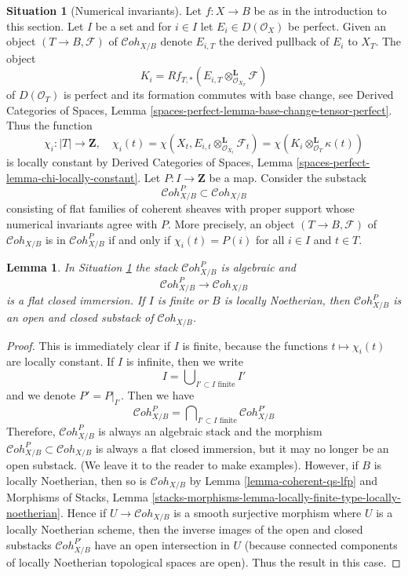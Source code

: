 \documentclass{stacks-project}
\theoremstyle{plain}
\newtheorem{lemma}[subsection]{Lemma}
\theoremstyle{definition}
\newtheorem{situation}[subsection]{Situation}
\theoremstyle{remark}
\numberwithin{equation}{subsection}
\def\Cohstack{\mathcal{C}\!\mathit{oh}}
\begin{document}
\begin{situation}[Numerical invariants]
\label{situation-numerical}
Let $f : X \to B$ be as in the introduction to this section. Let $I$
be a set and for $i \in I$ let $E_i \in D(\mathcal{O}_X)$ be perfect.
Given an object $(T \to B, \mathcal{F})$ of $\Cohstack_{X/B}$
denote $E_{i, T}$ the derived pullback of $E_i$ to $X_T$.
The object
$$
K_i = Rf_{T, *}(E_{i, T} \otimes_{\mathcal{O}_{X_T}}^\mathbf{L} \mathcal{F})
$$
of $D(\mathcal{O}_T)$ is perfect and its formation commutes with base change,
see Derived Categories of Spaces, Lemma
\ref{spaces-perfect-lemma-base-change-tensor-perfect}.
Thus the function
$$
\chi_i : |T| \longrightarrow \mathbf{Z},\quad
\chi_i(t) =
\chi(X_t, E_{i, t} \otimes_{\mathcal{O}_{X_t}}^\mathbf{L} \mathcal{F}_t) =
\chi(K_i \otimes_{\mathcal{O}_T}^\mathbf{L} \kappa(t))
$$
is locally constant by Derived Categories of Spaces, Lemma
\ref{spaces-perfect-lemma-chi-locally-constant}.
Let $P : I \to \mathbf{Z}$ be a map. Consider the substack
$$
\Cohstack^P_{X/B} \subset \Cohstack_{X/B}
$$
consisting of flat families of coherent sheaves with proper support
whose numerical invariants agree with $P$. More precisely, an object
$(T \to B, \mathcal{F})$ of $\Cohstack_{X/B}$ is in
$\Cohstack^P_{X/B}$ if and only if $\chi_i(t) = P(i)$ for all $i \in I$
and $t \in T$.
\end{situation}

\begin{lemma}
\label{lemma-open-P}
In Situation \ref{situation-numerical} the stack
$\Cohstack^P_{X/B}$ is algebraic and
$$
\Cohstack^P_{X/B} \longrightarrow \Cohstack_{X/B}
$$
is a flat closed immersion. If $I$ is finite or $B$ is locally
Noetherian, then $\Cohstack^P_{X/B}$ is an open and closed substack of
$\Cohstack_{X/B}$.
\end{lemma}

\begin{proof}
This is immediately clear if $I$ is finite, because the functions
$t \mapsto \chi_i(t)$ are locally constant. If $I$ is infinite, then
we write
$$
I = \bigcup\nolimits_{I' \subset I\text{ finite}} I'
$$
and we denote $P' = P|_{I'}$. Then we have
$$
\Cohstack^P_{X/B} = \bigcap\nolimits_{I' \subset I\text{ finite}}
\Cohstack^{P'}_{X/B}
$$
Therefore, $\Cohstack^P_{X/B}$ is always an algebraic stack and the morphism
$\Cohstack^P_{X/B} \subset \Cohstack_{X/B}$ is always a flat closed immersion,
but it may no longer be an open substack. (We leave it to the reader to
make examples). However, if $B$ is locally Noetherian, then so
is $\Cohstack_{X/B}$ by Lemma \ref{lemma-coherent-qs-lfp} and
Morphisms of Stacks, Lemma
\ref{stacks-morphisms-lemma-locally-finite-type-locally-noetherian}.
Hence if $U \to \Cohstack_{X/B}$ is a smooth surjective morphism
where $U$ is a locally Noetherian scheme, then the inverse images of
the open and closed substacks $\Cohstack^{P'}_{X/B}$
have an open intersection in $U$ (because connected components of
locally Noetherian topological spaces are open).
Thus the result in this case.
\end{proof}
\end{document}

